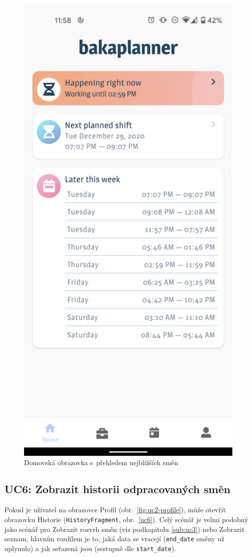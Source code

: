 \documentclass[twoside]{ctuthesis}
\begin{document}
\begin{figure}[ht]
	\includegraphics[width=.45\linewidth]{img/uc5.png}
	\caption{Domovská obrazovka s~přehledem nejbližších směn}
	\label{uc5}
\end{figure}
\newpage


\subsection{UC6: Zobrazit historii odpracovaných směn}\label{sub:uc6}

Pokud je uživatel na obrazovce Profil (obr.~\ref{fig:uc2-profile}), může otevřít obrazovku Historie (\texttt{HistoryFragment}, obr.~\ref{uc6}). Celý scénář je velmi podobný jako scénář pro Zobrazit rozvrh směn (viz podkapitolu \ref{sub:uc3}) nebo Zobrazit seznam, hlavním rozdílem je to, jaká data se vracejí (\texttt{end\_date} směny už uplynulo) a jak seřazená jsou (sestupně dle \texttt{start\_date}).
\end{document}
